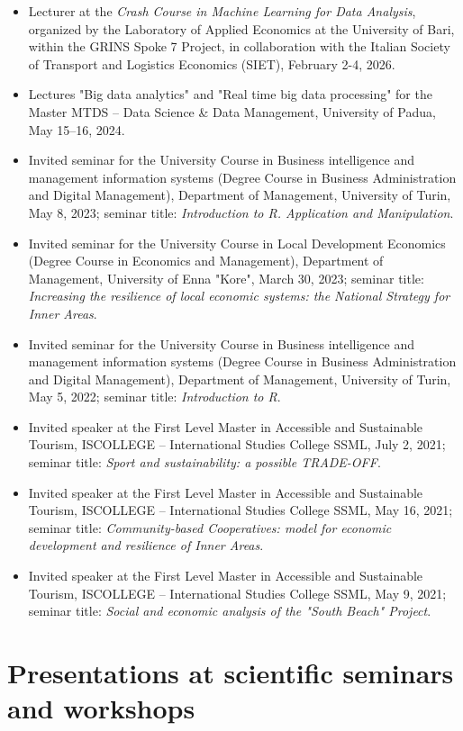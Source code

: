 \documentclass[11pt,a4paper,sans]{moderncv} %
\begin{document}
\begin{itemize}
    \item Lecturer at the \textit{Crash Course in Machine Learning for Data Analysis}, organized by the Laboratory of Applied Economics at the University of Bari, within the GRINS Spoke 7 Project, in collaboration with the Italian Society of Transport and Logistics Economics (SIET), February 2-4, 2026.  
    \item Lectures "Big data analytics" and "Real time big data processing" for the Master MTDS – Data Science \& Data Management, University of Padua, May 15–16, 2024.
    \item Invited seminar for the University Course in Business intelligence and management information systems (Degree Course in Business Administration and Digital Management), Department of Management, University of Turin, May 8, 2023; seminar title: \textit{Introduction to R. Application and Manipulation}.
    \item Invited seminar for the University Course in Local Development Economics (Degree Course in Economics and Management), Department of Management, University of Enna "Kore", March 30, 2023; seminar title: \textit{Increasing the resilience of local economic systems: the National Strategy for Inner Areas}.
    \item Invited seminar for the University Course in Business intelligence and management information systems (Degree Course in Business Administration and Digital Management), Department of Management, University of Turin, May 5, 2022; seminar title: \textit{Introduction to R}.
    \item Invited speaker at the First Level Master in Accessible and Sustainable Tourism, ISCOLLEGE – International Studies College SSML, July 2, 2021; seminar title: \textit{Sport and sustainability: a possible TRADE-OFF}.
    \item Invited speaker at the First Level Master in Accessible and Sustainable Tourism, ISCOLLEGE – International Studies College SSML, May 16, 2021; seminar title: \textit{Community-based Cooperatives: model for economic development and resilience of Inner Areas}.
    \item Invited speaker at the First Level Master in Accessible and Sustainable Tourism, ISCOLLEGE – International Studies College SSML, May 9, 2021; seminar title: \textit{Social and economic analysis of the "South Beach" Project}.
\end{itemize}




\section{\textbf{Presentations at scientific seminars and workshops}}
\end{document}
